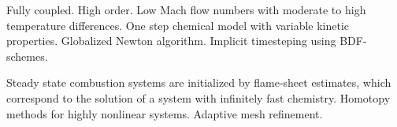 Fully coupled.
High order.
Low Mach flow numbers with moderate to high temperature differences. 
One step chemical model with variable kinetic properties.
Globalized Newton algorithm.
Implicit timesteping using BDF-schemes. 


Steady state combustion systems are initialized by flame-sheet estimates, which correspond to the solution of a system with infinitely fast chemistry. 
Homotopy methods for highly nonlinear systems.
Adaptive mesh refinement.


